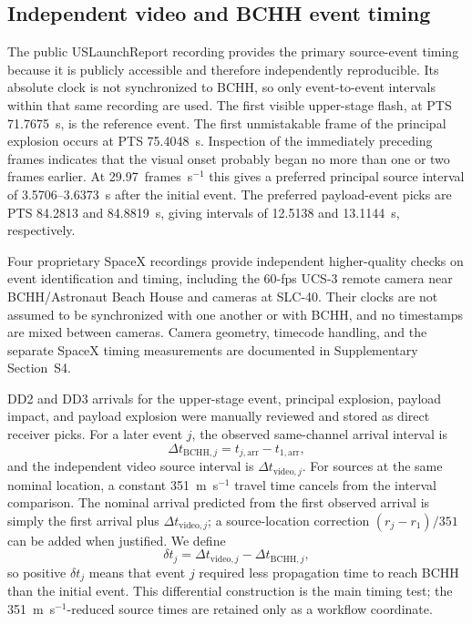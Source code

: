 \documentclass[]{seismica}
\begin{document}
\subsection{Independent video and BCHH event timing}

The public USLaunchReport recording \citep{uslaunchreport_amos6_video_2016}
provides the primary source-event timing because it is publicly accessible and
therefore independently reproducible. Its absolute clock is not synchronized to
BCHH, so only event-to-event intervals within that same recording are used. The
first visible upper-stage flash, at PTS 71.7675~s, is the reference event. The
first unmistakable frame of the principal explosion occurs at PTS 75.4048~s.
Inspection of the immediately preceding frames indicates that the visual onset
probably began no more than one or two frames earlier. At 29.97~frames~s$^{-1}$
this gives a preferred principal source interval of 3.5706--3.6373~s after the
initial event. The preferred payload-event picks are PTS 84.2813 and
84.8819~s, giving intervals of 12.5138 and 13.1144~s, respectively.

Four proprietary SpaceX recordings provide independent higher-quality checks
on event identification and timing, including the 60-fps UCS-3 remote camera
near BCHH/Astronaut Beach House and cameras at SLC-40. Their clocks are not
assumed to be synchronized with one another or with BCHH, and no timestamps
are mixed between cameras. Camera geometry, timecode handling, and the
separate SpaceX timing measurements are documented in Supplementary
Section~S4.

DD2 and DD3 arrivals for the upper-stage event, principal explosion, payload
impact, and payload explosion were manually reviewed and stored as direct
receiver picks. For a later event $j$, the observed same-channel arrival
interval is
\begin{equation}
 \Delta t_{\mathrm{BCHH},j}=t_{j,\mathrm{arr}}-t_{1,\mathrm{arr}},
\end{equation}
and the independent video source interval is
$\Delta t_{\mathrm{video},j}$. For sources at the same nominal location, a
constant 351~m~s$^{-1}$ travel time cancels from the interval comparison. The
nominal arrival predicted from the first observed arrival is simply the first
arrival plus $\Delta t_{\mathrm{video},j}$; a source-location correction
$(r_j-r_1)/351$ can be added when justified. We define
\begin{equation}
 \delta t_j=\Delta t_{\mathrm{video},j}-\Delta t_{\mathrm{BCHH},j},
 \label{eq:differential_advance}
\end{equation}
so positive $\delta t_j$ means that event $j$ required less propagation time
to reach BCHH than the initial event. This differential construction is the
main timing test; the 351~m~s$^{-1}$-reduced source times are retained only as
a workflow coordinate.
\end{document}
